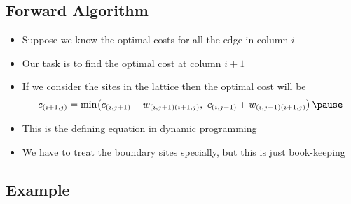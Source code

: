 
\begin{slide}
\section[-0.5]{Forward Algorithm}

\begin{PauseHighLight}
  \begin{itemize}
  \item Suppose we know the optimal costs for all the edge in column
    $i$\pause
  \item Our task is to find the optimal cost at column $i+1$\pause
  \item If we consider the sites in the lattice then the optimal cost
    will be
    \begin{align*}
      c_{(i+1,j)} = \min\!\left( \strut c_{(i,j+1)}+w_{(i,j+1)(i+1,j)},\,\,
        c_{(i,j-1)}+w_{(i,j-1)(i+1,j)}\right)\pause
    \end{align*}
  \item This is the defining equation in dynamic programming\pause
  \item We have to treat the boundary sites specially, but this is just
    book-keeping\pause
  \end{itemize}
\end{PauseHighLight}

\end{slide}


\begin{slide}
\section[-2]{Example}
\pb
\begin{center}
  \pause
\end{center}
\end{slide}



